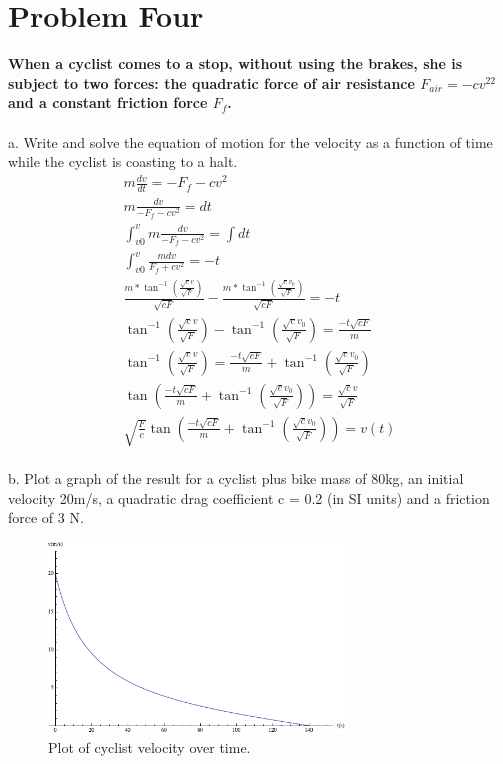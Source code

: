 \documentclass[10pt]{article} %
\begin{document}
\vspace{1 cm}       

\section{Problem Four}
\textbf{When a cyclist comes to a stop, without using the brakes, she is subject to two forces: the quadratic force of air resistance  $F_{air} = −cv^22$ and a constant friction force  $F_f$.} \\ \\

a. Write and solve the equation of motion for the velocity as a function of time while the cyclist is coasting to a halt.\\

\begin{align}
  m\frac{dv}{dt} = -F_f - cv^2\\
  m\frac{dv}{-F_f - cv^2} = dt\\
  \int_{v0}^v m\frac{dv}{-F_f - cv^2} = \int dt\\
  \int_{v0}^v \frac{mdv}{F_f + cv^2} = -t\\
  \frac{m*\tan^{-1}(\frac{\sqrt{c}v}{\sqrt{F}})}{\sqrt{cF}} - \frac{m*\tan^{-1}(\frac{\sqrt{c}v_0}{\sqrt{F}})}{\sqrt{cF}} = -t\\
  \tan^{-1}(\frac{\sqrt{c}v}{\sqrt{F}}) - \tan^{-1}(\frac{\sqrt{c}v_0}{\sqrt{F}}) = \frac{-t\sqrt{cF}}{m}\\
  \tan^{-1}(\frac{\sqrt{c}v}{\sqrt{F}}) = \frac{-t\sqrt{cF}}{m} + \tan^{-1}(\frac{\sqrt{c}v_0}{\sqrt{F}})\\  
  \tan(\frac{-t\sqrt{cF}}{m} + \tan^{-1}(\frac{\sqrt{c}v_0}{\sqrt{F}})) = \frac{\sqrt{c}v}{\sqrt{F}}\\
  \sqrt{\frac{F}{c}}\tan(\frac{-t\sqrt{cF}}{m} + \tan^{-1}(\frac{\sqrt{c}v_0}{\sqrt{F}})) = v(t)\\    
\end{align}

b. Plot  a  graph  of  the  result  for  a  cyclist  plus  bike  mass  of  80kg,  an  initial  velocity 20m/s, a quadratic drag coefficient  c = 0.2 (in SI units) and a  friction  force of 3 N.\\

\begin{figure}[h!]
  \caption{Plot of cyclist velocity over time.}
  \centering
    \includegraphics[width=0.7\textwidth]{images/cyclist_velocity_m1.png}
\end{figure}
\end{document}
